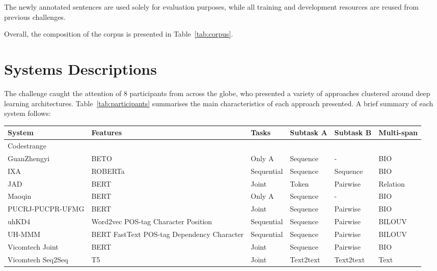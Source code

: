 \documentclass[a4paper,11pt,twocolumn,twoside]{article}
\begin{document}
The newly annotated sentences are used solely for evaluation purposes,
while all training and development resources are reused from previous challenges.

Overall, the composition of the corpus is presented in Table~\ref{tab:corpus}.

\begin{table}
  \caption{Composition of the corpus, highlighting resources from previous
  challenges and newly annotated sentences.\label{tab:corpus}}
\end{table}

\section{Systems Descriptions}\label{sec:systems}

The challenge caught the attention of 8 participants from across the globe,
who presented a variety of approaches clustered around deep learning architectures.
Table~\ref{tab:participants} summarises the main characteristics of each approach presented.
A brief summary of each system follows:

\begin{table*}[ht]
  \centering
  \begin{tabularx}{\textwidth}{lXllll}
    \toprule
    System & Features & Tasks & Subtask A & Subtask B & Multi-span \\
    \midrule
    Codestrange & 				 \\
    GuanZhengyi & BETO & Only A & Sequence & - & BIO \\
    IXA & ROBERTa & Sequential & Sequence & Sequence & BIO \\
    JAD & BERT & Joint & Token & Pairwise & Relation \\
    Maoqin & BERT & Only A & Sequence & - & BIO \\
    PUCRJ-PUCPR-UFMG & BERT & Joint & Sequence & Pairwise & BIO \\
    uhKD4 & Word2vec POS-tag Character Position & Sequential & Sequence & Pairwise & BILOUV \\
    UH-MMM & BERT FastText POS-tag Dependency Character & Sequential & Sequence & Pairwise & BILOUV \\
    Vicomtech Joint & BERT & Joint & Sequence & Pairwise & BIO \\
    Vicomtech Seq2Seq & T5 & Joint & Text2text & Text2text & Text \\
    \bottomrule
  \end{tabularx}
  \caption{Summary of the approaches presented at the eHealth-KD Challenge.\label{tab:participants}}
\end{table*}
\end{document}
